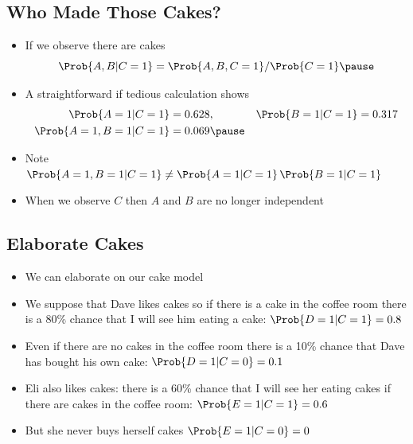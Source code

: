 
\begin{slide}
\section{Who Made Those Cakes?}

\begin{PauseHighLight}
  \begin{itemize}
    \item If we observe there are cakes
    $$ \Prob{A,B|C=1} = \Prob{A,B,C=1}/\Prob{C=1} \pause $$
  \item A straightforward if tedious calculation shows
    \begin{align*}
      \Prob{A=1|C=1} &=0.628, &
      \Prob{B=1|C=1} &= 0.317 \\
      \Prob{A=1,B=1|C=1} &= 0.069 \pause
    \end{align*}
  \item Note \(\Prob{A=1,B=1|C=1} \neq \Prob{A=1|C=1} \,
    \Prob{B=1|C=1}\)\pause
  \item When we observe $C$ then $A$ and $B$ are no longer independent\pause
  \end{itemize}
\end{PauseHighLight}

\end{slide}


\begin{slide}
\section[-2]{Elaborate Cakes}

\begin{PauseHighLight}
  \begin{itemize}\squeeze
  \item We can elaborate on our cake model\pause
  \item We suppose that Dave likes cakes so if there is a cake in the
    coffee room there is a 80\% chance that I will see him eating a
    cake: \(\Prob{D=1|C=1}=0.8\)\pause
  \item Even if there are no cakes in the coffee room there is a 10\%
    chance that Dave has bought his own cake: \(\Prob{D=1|C=0}=0.1\)\pause
  \item Eli also likes cakes: there is a 60\% chance that I will see
    her eating cakes if there are cakes in the coffee room:
    \(\Prob{E=1|C=1}=0.6\)\pause
  \item But she never buys herself cakes \(\Prob{E=1|C=0}=0\)\pause
  \end{itemize}
\end{PauseHighLight}

\end{slide}

